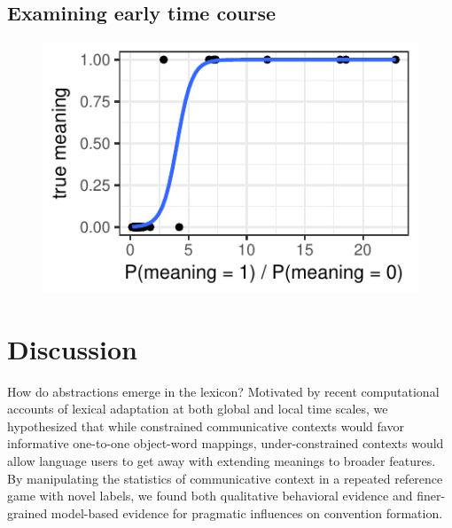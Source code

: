\documentclass[10pt,letterpaper]{article}
\begin{document}
\subsection{Examining early time course}


\begin{figure}[t]
\begin{center}
{\includegraphics[scale=.94]{postTestPrediction.pdf}}
{\caption{{\footnotesize {}  \label{fig:postTestPrediction}}}}
\end{center}
\end{figure}


\section{Discussion}

How do abstractions emerge in the lexicon? Motivated by recent computational accounts of lexical adaptation at both global and local time scales, we hypothesized that while constrained communicative contexts would favor informative one-to-one object-word mappings, under-constrained contexts would allow language users to get away with extending meanings to broader features. By manipulating the statistics of communicative context in a repeated reference game with novel labels, we found both qualitative behavioral evidence and finer-grained model-based evidence for pragmatic influences on convention formation.
\end{document}
